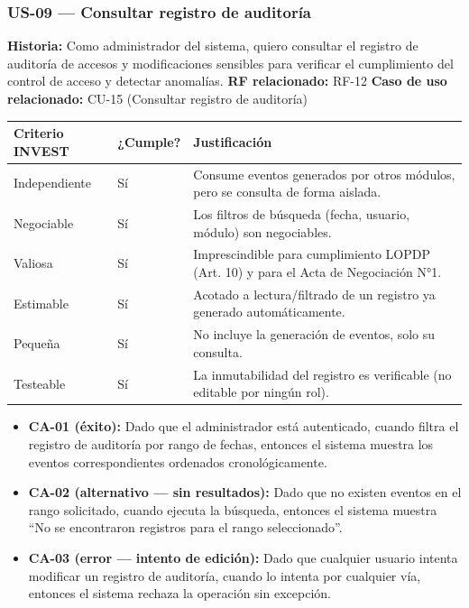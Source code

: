 \documentclass[11pt,a4paper]{article}
\providecommand{\tightlist}{%
	\setlength{\itemsep}{0pt}\setlength{\parskip}{0pt}}
\begin{document}
	\subsubsection{US-09 --- Consultar registro de auditoría}
	
	\textbf{Historia:} Como administrador del sistema, quiero consultar el registro de auditoría de accesos y modificaciones sensibles para verificar el cumplimiento del control de acceso y detectar anomalías.
	\textbf{RF relacionado:} RF-12
	\textbf{Caso de uso relacionado:} CU-15 (Consultar registro de auditoría)
	
	\begin{longtable}{p{} p{} p{}}
		
		
		\toprule
		\textbf{Criterio INVEST} &
		\textbf{¿Cumple?} &
		\textbf{Justificación} \\
		\midrule
		\endhead
		
		Independiente & Sí & Consume eventos generados por otros módulos, pero se consulta de forma aislada. \\
		Negociable & Sí & Los filtros de búsqueda (fecha, usuario, módulo) son negociables. \\
		Valiosa & Sí & Imprescindible para cumplimiento LOPDP (Art. 10) y para el Acta de Negociación N°1. \\
		Estimable & Sí & Acotado a lectura/filtrado de un registro ya generado automáticamente. \\
		Pequeña & Sí & No incluye la generación de eventos, solo su consulta. \\
		Testeable & Sí & La inmutabilidad del registro es verificable (no editable por ningún rol). \\
		
		\bottomrule
	\end{longtable}
	
	\begin{itemize}
		\tightlist
		\item
		\textbf{CA-01 (éxito):} Dado que el administrador está autenticado, cuando filtra el registro de auditoría por rango de fechas, entonces el sistema muestra los eventos correspondientes ordenados cronológicamente.
		\item
		\textbf{CA-02 (alternativo --- sin resultados):} Dado que no existen eventos en el rango solicitado, cuando ejecuta la búsqueda, entonces el sistema muestra ``No se encontraron registros para el rango seleccionado''.
		\item
		\textbf{CA-03 (error --- intento de edición):} Dado que cualquier usuario intenta modificar un registro de auditoría, cuando lo intenta por cualquier vía, entonces el sistema rechaza la operación sin excepción.
	\end{itemize}
	
\end{document}
